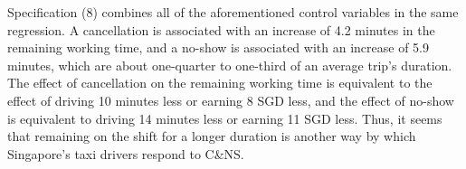 \documentclass[reviewmode]{restat}
\begin{document}
\begin{appendices}
Specification (8) combines all of the aforementioned  control variables in the same regression. 
A cancellation is associated with an increase of 4.2 minutes in the remaining working time, and a no-show
is associated with an increase of 5.9 minutes, which are about one-quarter to one-third of an average 
trip's duration. The effect of cancellation on the remaining working time is equivalent to the effect of
driving 10 minutes less or earning 8 SGD less, and the effect of no-show is equivalent to driving 14 minutes
less or earning 11 SGD less. 
 Thus, it seems that remaining on the shift for a longer duration is another way by which Singapore's taxi 
 drivers respond to C\&NS.
 	\begin{table}
 	\hspace*{-2pt}
\end{table}
\end{appendices}
\end{document}
